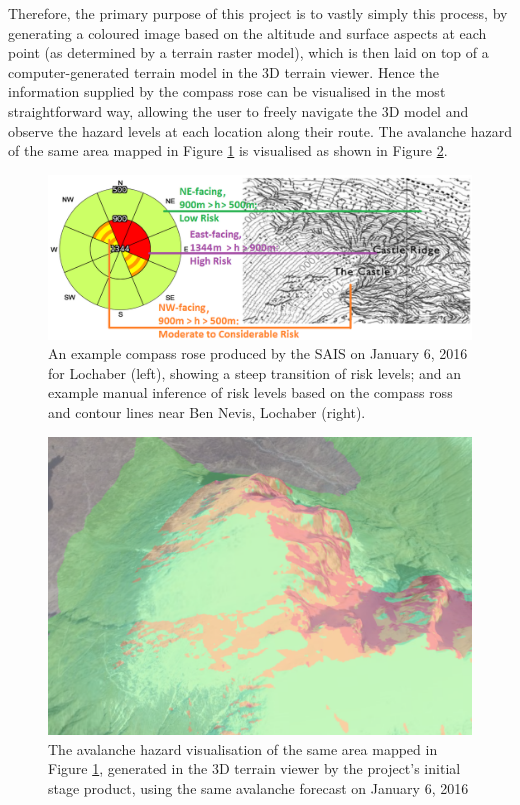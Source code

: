 \documentclass[openany]{UoYCSproject}
\begin{document}
Therefore, the primary purpose of this project is to vastly simply this process, by generating a coloured image based on the altitude and surface aspects at each point (as determined by a terrain raster model), which is then laid on top of a computer-generated terrain model in the 3D terrain viewer. Hence the information supplied by the compass rose can be visualised in the most straightforward way, allowing the user to freely navigate the 3D model and observe the hazard levels at each location along their route. The avalanche hazard of the same area mapped in Figure \ref{fig:mapping} is visualised as shown in Figure \ref{fig:stage1bennevis}.

\begin{figure}[h]
		\centering
		\includegraphics[scale=1]{Mapping.png}
		\caption{\label{fig:mapping} An example compass rose produced by the SAIS on January 6, 2016 for Lochaber (left), showing a steep transition of risk levels; and an example manual inference of risk levels based on the compass ross and contour lines near Ben Nevis, Lochaber (right).  \cite{sais-lochaber0106}}
\end{figure}

\begin{figure}[h]
		\centering
		\includegraphics[scale=0.3]{Stage1BenNevis.png}
		\caption{\label{fig:stage1bennevis} The avalanche hazard visualisation of the same area mapped in Figure \ref{fig:mapping}, generated in the 3D terrain viewer by the project's initial stage product, using the same avalanche forecast on January 6, 2016}
\end{figure}
\end{document}
